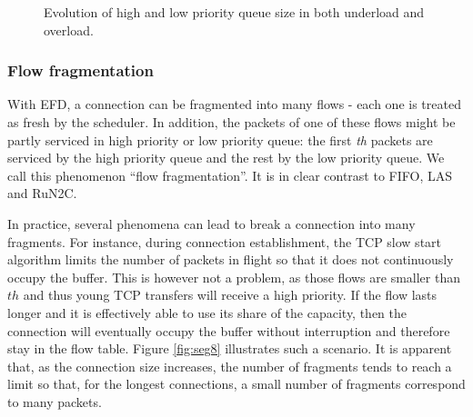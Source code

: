 \documentclass[preprint,12pt]{elsarticle}
\begin{document}
\begin{figure}[ht]
  \centering
  \caption{Evolution of high and low priority queue size  in both underload and overload.}
  \label{fig:queue_evo}
\end{figure}


\subsubsection{Flow fragmentation} \label{sec:fragmentation}

With EFD, a connection can be fragmented into many flows - each one is treated as fresh by the scheduler. In addition, the packets of one of these flows might be partly serviced in high priority or low priority queue: the first \textit{th} packets are serviced by the high priority queue and the rest by the low priority queue. We call this phenomenon ``flow fragmentation''. It is in clear contrast to FIFO, LAS and RuN2C.

In practice, several phenomena can lead to break a connection into many fragments. For instance,  during connection establishment, the TCP slow start algorithm limits the number of packets in flight so that it does not continuously occupy the buffer. This is however not a problem, as those flows are smaller than $th$ and thus young  TCP transfers will receive a high priority. If the flow lasts longer and it is effectively able to use its share of the capacity, then the connection will eventually occupy  the buffer without interruption and therefore stay in the flow table. Figure \ref{fig:seg8} illustrates such a scenario. It is apparent that, as the connection size increases, the number of fragments tends to reach a limit so that, for the longest connections, a small number of fragments correspond to many packets.
\end{document}

